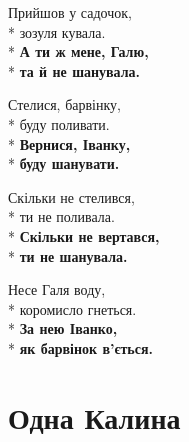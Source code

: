 \medskip

\begin{minipage}{\linewidth}
Прийшов у садочок,\\*
зозуля кувала.\\*
\textbf{А ти ж мене, Галю,}\\*
\textbf{та й не шанувала.}\\
\end{minipage}\par\medskip\nobreak

\medskip

\begin{minipage}{\linewidth}
Стелися, барвінку,\\*
буду поливати.\\*
\textbf{Вернися, Іванку,}\\*
\textbf{буду шанувати.}\\
\end{minipage}\par\medskip\nobreak

\medskip

\begin{minipage}{\linewidth}
Скільки не стелився,\\*
ти не поливала.\\*
\textbf{Скільки не вертався,}\\*
\textbf{ти не шанувала.}\\
\end{minipage}\par\medskip\nobreak

\medskip

\begin{minipage}{\linewidth}
Несе Галя воду,\\*
коромисло гнеться.\\*
\textbf{За нею Іванко,}\\*
\textbf{як барвінок в’ється.}\\
\end{minipage}

\vspace{\fill}\newpage

\section{Одна Калина}
\label{song:Одна_Калина}


